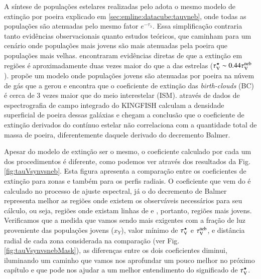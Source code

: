 A síntese de populações estelares realizadas pelo \starlight adota o mesmo modelo de extinção por
poeira explicado em \ref{sec:emline:datacube:tauvneb}, onde todas as populações são atenuadas pelo
mesmo fator $e^{-\tau_\lambda}$. Essa simplificação contraria tanto evidências observacionais quanto
estudos teóricos, que caminham para um cenário onde populações mais jovens são mais atenuadas pela
poeira que populações mais velhas. \citet{Calzetti.etal.1994a} encontraram evidências diretas de que
a extinção em regiões \Hii é aproximadamente duas vezes maior do que a das estrelas ($\tau_{\mathrm{V}}^\star \sim
0.44 \tau_{\mathrm{V}}^{\mathrm{neb}}$). \citet{Charlot.Fall.2000a} propõe um modelo onde populações jovens são atenuadas por
poeira na núvem de gás que a gerou e encontra que o coeficiente de extinção das {\em birth-clouds}
(BC) é cerca de 3 vezes maior que  do meio interestelar (ISM). \citet{Kreckel.etal.2013a} através de
dados de espectrografia de campo integrado do KINGFISH \citep{Kennicutt.etal.2011a} calculam a
densidade superficial de poeira dessas galáxias e chegam a conclusão que o coeficiente de extinção
derivados do contínuo estelar não correlaciona com a quantidade total de massa de poeira,
diferentemente daquele derivado do decremento Balmer.

Apesar do modelo de extinção ser o mesmo, o coeficiente calculado por cada um dos procedimentos é
diferente, como podemos ver através dos resultados da Fig. \ref{fig:tauVsynvsneb}. Esta figura
apresenta a comparação entre os coeficientes de extinção para zonas e também para os perfis radiais.
O coeficiente que vem do \starlight é calculado no processo de ajuste espectral, já o do decremento
de Balmer representa melhor as regiões onde existem os observáveis necessários para seu cálculo, ou
seja, regiões onde existam linhas de \Halpha e \Hbeta, portanto, regiões mais jovens. Verificamos
que a medida que vamos sendo mais exigentes com a fração de luz proveniente das populações jovens
($x_Y$), valor mínimo de $\tau_{\mathrm{V}}^\star$ e $\tau_{\mathrm{V}}^{\mathrm{neb}}$, e distância radial de cada zona considerada na
comparação (ver Fig. \ref{fig:tauVsynvsnebMask}), as diferenças entre os dois coeficientes diminui,
iluminando um caminho que vamos nos aprofundar um pouco melhor no próximo capítulo e que pode nos
ajudar a um melhor entendimento do significado de $\tau_{\mathrm{V}}^\star$.

